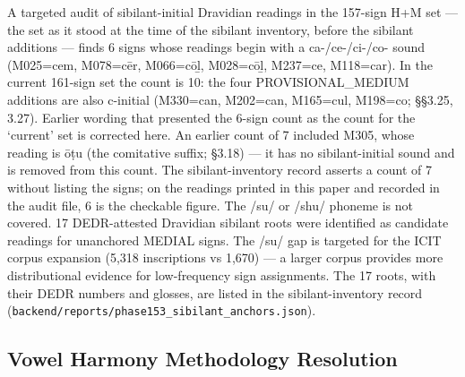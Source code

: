 \documentclass[11pt]{article}
\begin{document}
A targeted audit of sibilant-initial Dravidian readings in the 157-sign H+M set --- the set as it stood at the time of the sibilant inventory, before the sibilant additions --- finds 6 signs whose readings begin with a ca-/ce-/ci-/co- sound (M025=cem, M078=cēr, M066=cōḻ, M028=cōḻ, M237=ce, M118=car). In the current 161-sign set the count is 10: the four PROVISIONAL\_MEDIUM additions are also c-initial (M330=can, M202=can, M165=cul, M198=co; §§3.25, 3.27). Earlier wording that presented the 6-sign count as the count for the `current' set is corrected here. An earlier count of 7 included M305, whose reading is ōṭu (the comitative suffix; §3.18) --- it has no sibilant-initial sound and is removed from this count. The sibilant-inventory record asserts a count of 7 without listing the signs; on the readings printed in this paper and recorded in the audit file, 6 is the checkable figure. The /su/ or
/shu/ phoneme is not covered. 17 DEDR-attested Dravidian sibilant roots
were identified as candidate readings for unanchored MEDIAL signs. The
/su/ gap is targeted for the ICIT corpus expansion (5,318 inscriptions
vs 1,670) --- a larger corpus provides more distributional evidence for low-frequency sign assignments. The 17 roots, with their DEDR numbers and glosses, are listed in the sibilant-inventory record (\texttt{backend/reports/phase153\_sibilant\_anchors.json}).

\subsection{Vowel Harmony Methodology Resolution
}\label{vowel-harmony-methodology-resolution-phase-154}
\end{document}
